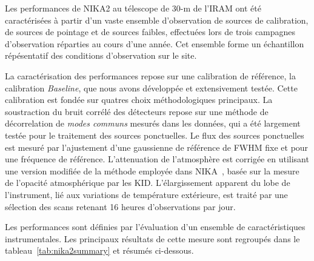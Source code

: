 Les performances de NIKA2 au télescope de 30-m de l'IRAM ont été
caractérisées à partir d'un vaste ensemble d'observation de sources de
calibration, de sources de pointage et de sources faibles, effectuées
lors de trois campagnes d'observation réparties au cours d'une année. Cet
ensemble forme un échantillon répésentatif des conditions
d'observation sur le site.

La caractérisation des performances repose sur une calibration de
référence, la calibration \emph{Baseline}, que nous avons développée
et extensivement testée. Cette calibration est fondée sur quatres
choix méthodologiques principaux. La soustraction du bruit corrélé des
détecteurs repose sur une méthode de décorrelation de \emph{modes
  communs} mesurés dans les données, qui a été largement testée pour
le traitement des sources ponctuelles. Le flux des sources ponctuelles
est mesuré par l'ajustement d'une gaussienne de référence de FWHM fixe
et pour une fréquence de référence. L'attenuation de l'atmosphère est
corrigée en utilisant une version modifiée de la méthode employée dans
NIKA~\citep{Catalano2014}, basée sur la mesure de l'opacité
atmosphérique par les KID. L'élargissement apparent du
lobe de l'instrument, lié aux variations de température extérieure,
est traité par une sélection des scans retenant 16 heures
d'observations par jour.

Les performances sont définies par l'évaluation d'un ensemble de
caractéristiques instrumentales. Les principaux résultats de cette
mesure sont regroupés dans le tableau~\ref{tab:nika2summary} et
résumés ci-dessous.

